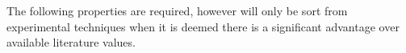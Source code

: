 The following properties are required, however will only be sort from
experimental techniques when it is deemed there is a significant advantage over
available literature values.
